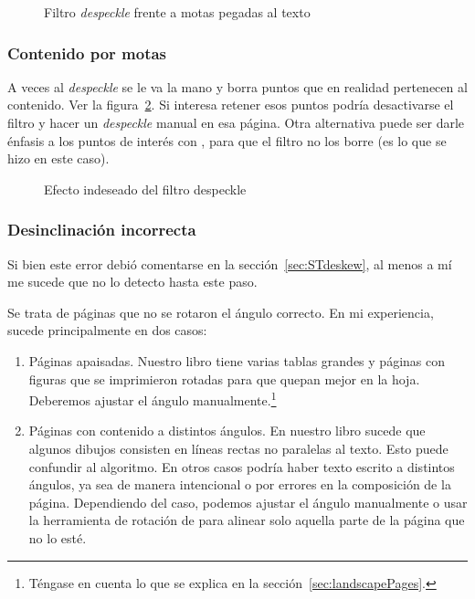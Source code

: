 \documentclass[%
	a5paper,
	10pt,
	twoside,
	openright,
	final,
]{memoir}
\begin{document}
{	\begin{figure}
		\hfill
		\caption{Filtro \emph{despeckle} frente a motas pegadas al texto\label{fig:SToutputDespeckleSpeckle}}
	\end{figure}

	\subsubsection{Contenido por motas} A veces al \emph{despeckle} se le va la mano y borra puntos que en realidad pertenecen al contenido. Ver la figura~\ref{fig:SToutputDespeckle}. Si interesa retener esos puntos podría desactivarse el filtro y hacer un \emph{despeckle} manual en esa página. Otra alternativa puede ser darle énfasis a los puntos de interés con \gimp, para que el filtro no los borre (es lo que se hizo en este caso).

	\begin{figure}
		\caption{Efecto indeseado del filtro despeckle\label{fig:SToutputDespeckle}}
	\end{figure}

	\subsubsection{Desinclinación incorrecta} Si bien este error debió comentarse en la sección~\ref{sec:STdeskew}, al menos a mí me sucede que no lo detecto hasta este paso.

	Se trata de páginas que no se rotaron el ángulo correcto. En mi experiencia, sucede principalmente en dos casos:
	\begin{enumerate}
		\item Páginas apaisadas. Nuestro libro tiene varias tablas grandes y páginas con figuras que se imprimieron rotadas para que quepan mejor en la hoja. Deberemos ajustar el ángulo manualmente.\footnote{Téngase en cuenta lo que se explica en la sección~\ref{sec:landscapePages}.}
		\item Páginas con contenido a distintos ángulos. En nuestro libro sucede que algunos dibujos consisten en líneas rectas no paralelas al texto. Esto puede confundir al algoritmo. En otros casos podría haber texto escrito a distintos ángulos, ya sea de manera intencional o por errores en la composición de la página. Dependiendo del caso, podemos ajustar el ángulo manualmente o usar la herramienta de rotación de \gimp para alinear solo aquella parte de la página que no lo esté.
	\end{enumerate}

}
\end{document}
